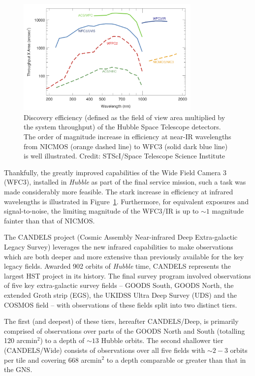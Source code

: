 \begin{figure}[hbt!]
	\centering
	\includegraphics[width=0.8\textwidth]{hst_efficiency.png}
	\caption[Discovery efficiency (defined as the field of view area multiplied by the system throughput) of the Hubble Space Telescope detectors.]{Discovery efficiency (defined as the field of view area multiplied by the system throughput) of the Hubble Space Telescope detectors. The order of magnitude increase in efficiency at near-IR wavelengths from NICMOS (orange dashed line) to WFC3 (solid dark blue line) is well illustrated. Credit: STScI/Space Telescope Science Institute}
		\label{fig:hst_efficiency}
\end{figure}

Thankfully, the greatly improved capabilities of the Wide Field Camera 3 (WFC3), installed in \emph{Hubble} as part of the final service mission, such a task was made considerably more feasible. The stark increase in efficiency at infrared wavelengths is illustrated in Figure~\ref{fig:hst_efficiency}. Furthermore, for equivalent exposures and signal-to-noise, the limiting magnitude of the WFC3/IR is up to $\sim 1$ magnitude fainter than that of NICMOS.

The CANDELS project (Cosmic Assembly Near-infrared Deep Extra-galactic Legacy Survey) leverages the new infrared capabilities to make observations which are both deeper and more extensive than previously available for the key legacy fields. Awarded 902 orbits of \emph{Hubble} time, CANDELS represents the largest HST project in its history. The final survey program involved observations of five key extra-galactic survey fields -- GOODS South, GOODS North, the extended Groth strip (EGS), the UKIDSS Ultra Deep Survey (UDS) and the COSMOS field -- with observations of these fields split into two distinct tiers. 

The first (and deepest) of these tiers, hereafter CANDELS/Deep, is primarily comprised of observations over parts of the GOODS North and South (totalling 120 arcmin$^{2}$) to a depth of $\sim 13$ Hubble orbits. The second shallower tier (CANDELS/Wide) consists of observations over all five fields with $\sim 2-3$ orbits per tile and covering 668 arcmin$^{2}$ to a depth comparable or greater than that in the GNS.

